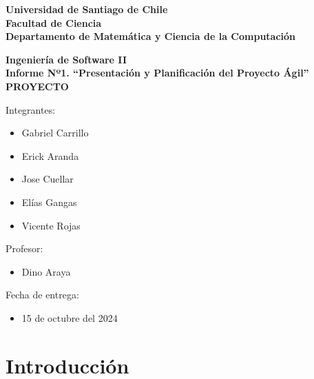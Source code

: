 \documentclass[letterpaper, 10pt]{article}
\newcommand{\nomproyecto}{PROYECTO}
\newenvironment{simplelist}
	{
		\renewcommand\labelitemi{}
		\begin{itemize}
		\setlength{\itemsep}{0pt}
		\setlength{\parskip}{0pt}
	}
	{\end{itemize}}
\begin{document}
\begin{titlepage}

\begin{center}
	{\bf Universidad de Santiago de Chile}
	\\
    {\bf Facultad de Ciencia}
	\\
    {\bf Departamento de Matem\'atica y Ciencia de la Computaci\'on}
\end{center}

%

\vfill
\begin{center}
{\large\bf Ingeniería de Software II}
\\
{\Large\bf Informe Nº1. “Presentación y Planificación del Proyecto Ágil”}\\
\vspace{1cm}
{\Huge\bf \nomproyecto}
\end{center}
\vfill

%

\begin{flushright}
	\begin{minipage}{0.3\textwidth}
		Integrantes:
		\begin{simplelist}
			\item Gabriel Carrillo
			\item Erick Aranda
			\item Jose Cuellar
			\item Elías Gangas
			\item Vicente Rojas
		\end{simplelist}
	

		Profesor:
		\begin{simplelist}
			\item Dino Araya
		\end{simplelist}
	
		Fecha de entrega:
		\begin{simplelist}
			\item 15 de octubre del 2024
		\end{simplelist}
	\end{minipage}
\end{flushright}

\end{titlepage}

%

\tableofcontents
\listoftables
\listoffigures
\newpage

%

\section{Introducción}
\end{document}
